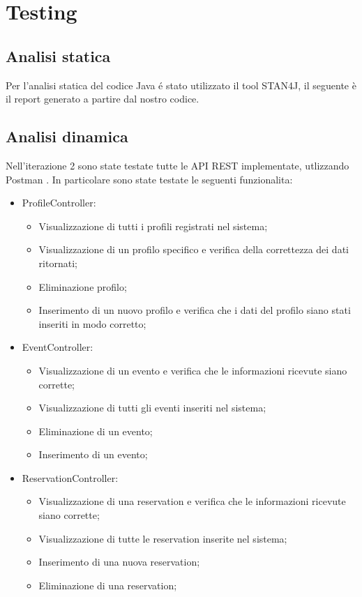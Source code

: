 \section{Testing}
\subsection{Analisi statica}
Per l’analisi statica del codice Java é stato utilizzato il tool STAN4J, il seguente è il report generato a partire dal nostro codice.
\\


\subsection{Analisi dinamica}
Nell’iterazione 2 sono state testate tutte le API REST implementate, utlizzando Postman .
In particolare sono state testate le seguenti funzionalita:

\begin{itemize}
	\item ProfileController:
	\begin{itemize}
		\item Visualizzazione di tutti i profili registrati nel sistema;
		\item Visualizzazione di un profilo specifico e verifica della correttezza dei dati ritornati;
		\item Eliminazione profilo;
		\item Inserimento di un nuovo profilo e verifica che i dati del profilo siano stati inseriti in modo corretto;
	\end{itemize}
	\item EventController:
	\begin{itemize}
		\item Visualizzazione di un evento e verifica che le informazioni ricevute siano corrette;
		\item Visualizzazione di tutti gli eventi inseriti nel sistema;
		\item Eliminazione di un evento;
		\item Inserimento di un evento;
	\end{itemize}
	\item ReservationController:
	\begin{itemize}
		\item Visualizzazione di una reservation e verifica che le informazioni ricevute siano corrette;
		\item Visualizzazione di tutte le reservation inserite nel sistema;
		\item Inserimento di una nuova reservation;
		\item Eliminazione di una reservation;
	\end{itemize}

\end{itemize}

